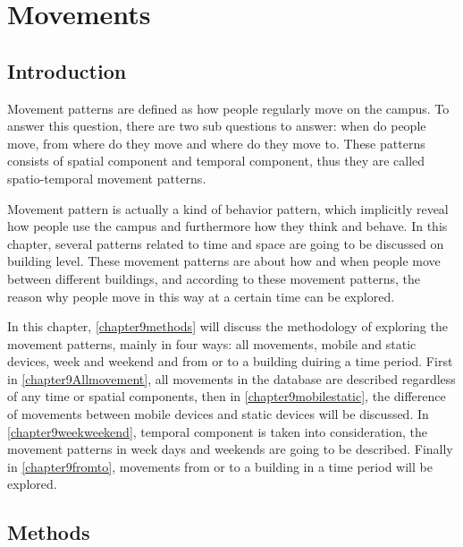 \chapter{Movements}\label{movements}


\section{Introduction}
Movement patterns are defined as how people regularly move on the campus. To answer this question, there are two sub questions to answer: when do people move, from where do they move and where do they move to. These patterns consists of spatial component and temporal component, thus they are called spatio-temporal movement patterns.

Movement pattern is actually a kind of behavior pattern, which implicitly reveal how people use the campus and furthermore how they think and behave. In this chapter, several patterns related to time and space are going to be discussed on building level. These movement patterns are about how and when  people move between different buildings, and according to these movement patterns, the reason why people move in this way at a certain time can be explored.

In this chapter, \autoref{chapter9methods} will discuss the methodology of exploring the movement patterns, mainly in four ways: all movements, mobile and static devices, week and weekend and from or to a building duiring a time period. First in \autoref{chapter9Allmovement}, all movements in the database are described regardless of any time or spatial components, then in \autoref{chapter9mobilestatic}, the difference of movements between mobile devices and static devices will be discussed. In \autoref{chapter9weekweekend}, temporal component is taken into consideration, the movement patterns in week days and weekends are going to be described. Finally in \autoref{chapter9fromto}, movements from or to a building in a time period will be explored. 

\section{Methods}\label{chapter9methods}

